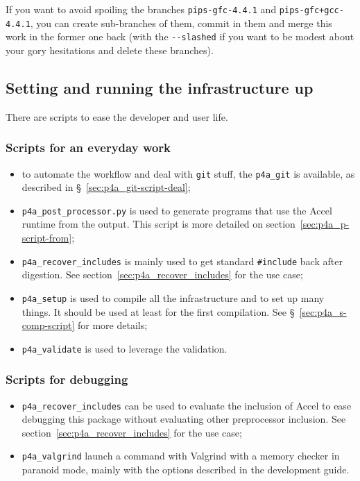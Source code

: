 \documentclass[a4paper]{article}
\begin{document}
If you want to avoid spoiling the branches \texttt{pips-gfc-4.4.1} and
\texttt{pips-gfc+gcc-4.4.1}, you can create sub-branches of them, commit in
them and merge this work in the former one back (with the \verb|--slashed|
if you want to be modest about your gory hesitations \smiley{} and delete
these branches).


\subsection{Setting and running the infrastructure up}
\label{sec:setup}

There are scripts to ease the developer and user life.


\subsubsection{Scripts for an everyday work}
\label{sec:an-everyday-work}

\begin{itemize}
\item to automate the \Apfa workflow and deal with \texttt{git} stuff, the
  \verb|p4a_git| is available, as described in
  \S~\ref{sec:p4a_git-script-deal};
\item \verb|p4a_post_processor.py| is used to generate programs that use
  the \Apfa Accel runtime from the \Apips output. This script is more
  detailed on section~\ref{sec:p4a_p-script-from};
\item \verb|p4a_recover_includes| is mainly used to get standard
  \verb|#include| back after \Apips digestion. See
  section~\ref{sec:p4a_recover_includes} for the use case;
\item \verb|p4a_setup| is used to compile all the \Apfa infrastructure and
  to set up many things. It should be used at least for the first
  compilation. See \S~\ref{sec:p4a_s-comp-script} for more details;
\item \verb|p4a_validate| is used to leverage the \Apips validation.
\end{itemize}


\subsubsection{Scripts for debugging}
\label{sec:scripts-debugging}

\begin{itemize}
\item \verb|p4a_recover_includes| can be used to evaluate the inclusion of
  \Apfa Accel to ease debugging this package without evaluating other
  preprocessor inclusion. See section~\ref{sec:p4a_recover_includes} for
  the use case;
\item \verb|p4a_valgrind| launch a command with Valgrind with a memory
  checker in paranoid mode, mainly with the options described in the
  \Apips development guide.
\end{itemize}
\end{document}
